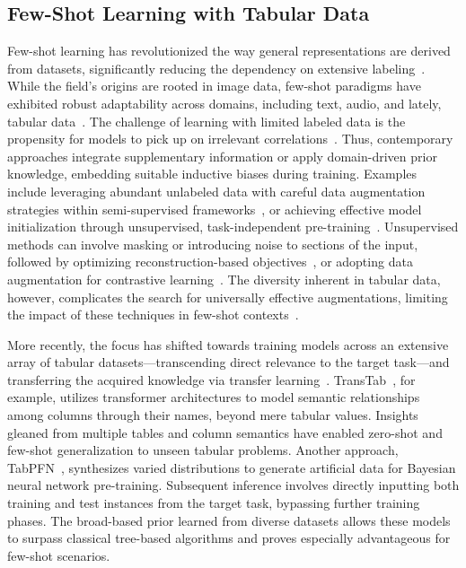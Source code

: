 \subsection{Few-Shot Learning with Tabular Data} Few-shot learning has revolutionized the way general representations are derived from datasets, significantly reducing the dependency on extensive labeling~\cite{chen2018closer}. While the field’s origins are rooted in image data, few-shot paradigms have exhibited robust adaptability across domains, including text, audio, and lately, tabular data~\cite{majumder2022few,nam2023stunt,schick2021exploiting}. The challenge of learning with limited labeled data is the propensity for models to pick up on irrelevant correlations~\cite{bartlett2021deep}. Thus, contemporary approaches integrate supplementary information or apply domain-driven prior knowledge, embedding suitable inductive biases during training. Examples include leveraging abundant unlabeled data with careful data augmentation strategies within semi-supervised frameworks~\cite{ucar2021subtab,yoon2020vime}, or achieving effective model initialization through unsupervised, task-independent pre-training~\cite{somepalli2021saint}. Unsupervised methods can involve masking or introducing noise to sections of the input, followed by optimizing reconstruction-based objectives~\cite{arik2021tabnet,majmundar2022met}, or adopting data augmentation for contrastive learning~\cite{bahri2022scarf,chen2020simple}. The diversity inherent in tabular data, however, complicates the search for universally effective augmentations, limiting the impact of these techniques in few-shot contexts~\cite{nam2023stunt}. 

More recently, the focus has shifted towards training models across an extensive array of tabular datasets—transcending direct relevance to the target task—and transferring the acquired knowledge via transfer learning~\cite{zhang2023generative,levin2022transfer,zhu2023xtab}. TransTab~\cite{wang2022transtab}, for example, utilizes transformer architectures to model semantic relationships among columns through their names, beyond mere tabular values. Insights gleaned from multiple tables and column semantics have enabled zero-shot and few-shot generalization to unseen tabular problems. Another approach, TabPFN~\cite{hollmann2022tabpfn}, synthesizes varied distributions to generate artificial data for Bayesian neural network pre-training. Subsequent inference involves directly inputting both training and test instances from the target task, bypassing further training phases. The broad-based prior learned from diverse datasets allows these models to surpass classical tree-based algorithms and proves especially advantageous for few-shot scenarios.

